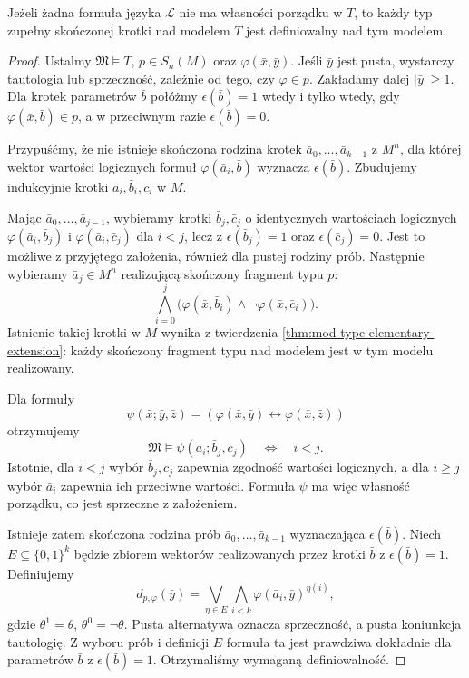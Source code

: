 \begin{twierdzenie}
\label{thm:mod-stable-definability}
Jeżeli żadna formuła języka $\mathcal L$
nie ma własności porządku w $T$, to każdy typ
zupełny skończonej krotki nad modelem $T$
jest definiowalny nad tym modelem.
\end{twierdzenie}
\begin{proof}
Ustalmy $\mathfrak M\models T$, $p\in S_n(M)$
oraz $\varphi(\bar x,\bar y)$.
Jeśli $\bar y$ jest pusta, wystarczy tautologia
lub sprzeczność, zależnie od tego, czy
$\varphi\in p$. Zakładamy dalej $|\bar y|\geq1$.
Dla krotek parametrów $\bar b$ połóżmy
$\epsilon(\bar b)=1$ wtedy i tylko wtedy,
gdy $\varphi(\bar x,\bar b)\in p$,
a w przeciwnym razie $\epsilon(\bar b)=0$.

Przypuśćmy, że nie istnieje skończona rodzina
krotek $\bar a_0,\ldots,\bar a_{k-1}$ z $M^n$,
dla której wektor wartości logicznych formuł
$\varphi(\bar a_i,\bar b)$ wyznacza
$\epsilon(\bar b)$. Zbudujemy indukcyjnie
krotki $\bar a_i,\bar b_i,\bar c_i$ w $M$.

Mając $\bar a_0,\ldots,\bar a_{j-1}$,
wybieramy krotki $\bar b_j,\bar c_j$
o identycznych wartościach logicznych
$\varphi(\bar a_i,\bar b_j)$ i
$\varphi(\bar a_i,\bar c_j)$ dla $i<j$,
lecz z $\epsilon(\bar b_j)=1$ oraz
$\epsilon(\bar c_j)=0$.
Jest to możliwe z przyjętego założenia,
również dla pustej rodziny prób.
Następnie wybieramy $\bar a_j\in M^n$
realizującą skończony fragment typu $p$:
\[
\bigwedge_{i=0}^j
\bigl(\varphi(\bar x,\bar b_i)\land
\neg\varphi(\bar x,\bar c_i)\bigr).
\]
Istnienie takiej krotki w $M$ wynika z
twierdzenia \ref{thm:mod-type-elementary-extension}:
każdy skończony fragment typu nad modelem
jest w tym modelu realizowany.

Dla formuły
\[
\psi(\bar x;\bar y,\bar z)=
(\varphi(\bar x,\bar y)
\leftrightarrow\varphi(\bar x,\bar z))
\]
otrzymujemy
\[
\mathfrak M\models\psi(\bar a_i;\bar b_j,\bar c_j)
\quad\Longleftrightarrow\quad i<j.
\]
Istotnie, dla $i<j$ wybór $\bar b_j,\bar c_j$
zapewnia zgodność wartości logicznych,
a dla $i\geq j$ wybór $\bar a_i$ zapewnia
ich przeciwne wartości.
Formuła $\psi$ ma więc własność porządku,
co jest sprzeczne z założeniem.

Istnieje zatem skończona rodzina prób
$\bar a_0,\ldots,\bar a_{k-1}$ wyznaczająca
$\epsilon(\bar b)$.
Niech $E\subseteq\{0,1\}^k$ będzie zbiorem
wektorów realizowanych przez krotki $\bar b$
z $\epsilon(\bar b)=1$. Definiujemy
\[
d_{p,\varphi}(\bar y)=
\bigvee_{\eta\in E}
\bigwedge_{i<k}\varphi(\bar a_i,\bar y)^{\eta(i)},
\]
gdzie $\theta^1=\theta$, $\theta^0=\neg\theta$.
Pusta alternatywa oznacza sprzeczność,
a pusta koniunkcja tautologię.
Z wyboru prób i definicji $E$ formuła ta
jest prawdziwa dokładnie dla parametrów
$\bar b$ z $\epsilon(\bar b)=1$.
Otrzymaliśmy wymaganą definiowalność.
\end{proof}

